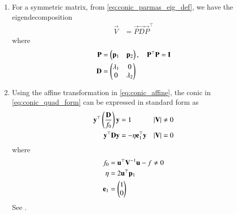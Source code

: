 \begin{enumerate}[label=\thesubsection.\arabic*.,ref=\thesubsection.\theenumi]
	\item For a symmetric matrix, from \eqref{eq:conic_parmas_eig_def}, we have the eigendecomposition
\begin{align}
	\vec{V}&=\vec{P}\vec{D}
\vec{P}^{\top}
\end{align}
where 
%
\begin{align}
	\mathbf{P} &= \begin{pmatrix}\mathbf{p}_1 & \mathbf{p}_2\end{pmatrix}, \quad 
\mathbf{P}^{\top}\mathbf{P} = 
	\mathbf{I}
\label{eq:eig_matrix}
\\
      \label{eq:D}
	  \mathbf{D} &= \begin{pmatrix}\lambda_1 & 0 \\ 0 & \lambda_2\end{pmatrix}
\end{align}
			\item Using the affine transformation in
					\label{app:std-prm-P}
	\eqref{eq:conic_affine},
	the conic in     \eqref{eq:conic_quad_form} can be expressed in standard form 
	as
  \begin{align}
    \label{eq:conic_simp_temp_nonparab}
	    \mathbf{y}^{\top}\left(\frac{\mathbf{D}}{f_0}\right)\mathbf{y} &= 1   &  \left\vert\mathbf{V}\right\vert &\ne 0
    \\
	    \mathbf{y}^{\top}\mathbf{D}\mathbf{y} &=  -\eta\mathbf{e}_1^{\top}\mathbf{y}   & \left\vert\mathbf{V}\right\vert &= 0
    \label{eq:conic_simp_temp_parab}
    \end{align}
    where
  \begin{align}
      \label{eq:f0}
	  f_0 &=\mathbf{u}^{\top}\mathbf{V}^{-1}\mathbf{u} -f \ne 0
	  \\
      \label{eq:eta}
       \eta &=2\mathbf{u}^{\top}\mathbf{p}_1
       \\
       \mathbf{e}_1 &=\begin{pmatrix}1 \\ 0\end{pmatrix}
      \end{align}
  \solution  See .
	  

\end{enumerate}
